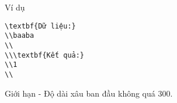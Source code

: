 Ví dụ
\begin{verbatim}
\textbf{Dữ liệu:}
\\baaba
\\
\\\textbf{Kết quả:}
\\1
\\\end{verbatim}
Giới hạn
- Độ dài xâu ban đầu không quá 300.
